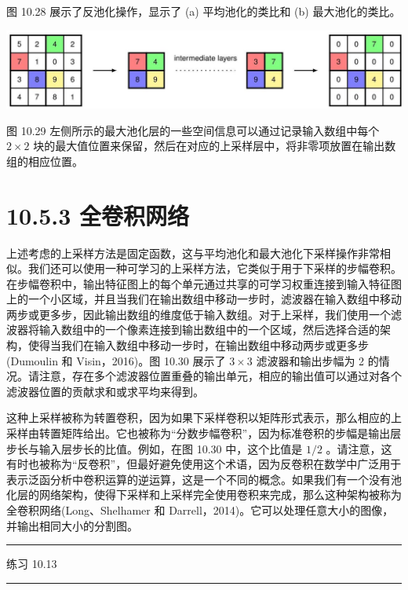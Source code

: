 \documentclass[10pt]{article}
\newcommand{\HRule}{\begin{center}\rule{0.9\linewidth}{0.2mm}\end{center}}
\begin{document}
图 10.28 展示了反池化操作，显示了 (a) 平均池化的类比和 (b) 最大池化的类比。

\begin{center}
\includegraphics[max width=1.0\textwidth]{images/0194e279-9b28-703a-88f4-c3ac21e2010d_337_177_343_1435_284_0.jpg}
\end{center}
\hspace*{3em} 

图 10.29 左侧所示的最大池化层的一些空间信息可以通过记录输入数组中每个 \(2 \times  2\) 块的最大值位置来保留，然后在对应的上采样层中，将非零项放置在输出数组的相应位置。

\section*{10.5.3 全卷积网络}

上述考虑的上采样方法是固定函数，这与平均池化和最大池化下采样操作非常相似。我们还可以使用一种可学习的上采样方法，它类似于用于下采样的步幅卷积。在步幅卷积中，输出特征图上的每个单元通过共享的可学习权重连接到输入特征图上的一个小区域，并且当我们在输出数组中移动一步时，滤波器在输入数组中移动两步或更多步，因此输出数组的维度低于输入数组。对于上采样，我们使用一个滤波器将输入数组中的一个像素连接到输出数组中的一个区域，然后选择合适的架构，使得当我们在输入数组中移动一步时，在输出数组中移动两步或更多步(Dumoulin 和 Visin，2016)。图 10.30 展示了 \(3 \times  3\) 滤波器和输出步幅为 2 的情况。请注意，存在多个滤波器位置重叠的输出单元，相应的输出值可以通过对各个滤波器位置的贡献求和或求平均来得到。

这种上采样被称为转置卷积，因为如果下采样卷积以矩阵形式表示，那么相应的上采样由转置矩阵给出。它也被称为“分数步幅卷积”，因为标准卷积的步幅是输出层步长与输入层步长的比值。例如，在图 10.30 中，这个比值是 \(1/2\) 。请注意，这有时也被称为“反卷积”，但最好避免使用这个术语，因为反卷积在数学中广泛用于表示泛函分析中卷积运算的逆运算，这是一个不同的概念。如果我们有一个没有池化层的网络架构，使得下采样和上采样完全使用卷积来完成，那么这种架构被称为全卷积网络(Long、Shelhamer 和 Darrell，2014)。它可以处理任意大小的图像，并输出相同大小的分割图。

\HRule

练习 10.13

\HRule
\end{document}
